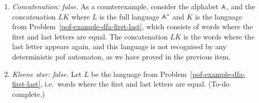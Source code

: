 {\begin{enumerate}
        
        \item \emph{Concatenation: false.} As a counterexample, consider the alphabet  $\mathbb A$, and  the concatenation $LK$ where $L$ is the full language $\mathbb A^*$ and  $K$ is the language from Problem~\ref{pof-example-dfa-first-last}, which consists of words where the first and last letters are equal.  The concatenation $LK$ is the words where the last letter appears again, and this language is not recognised by any deterministic pof automaton, as we have proved in the previous item.
        \item \emph{Kleene star: false.}  Let $L$ be the language from Problem~\ref{pof-example-dfa-first-last}, i.e.~words where the first and last letters are equal. (To-do complete.)
    \end{enumerate}

}



